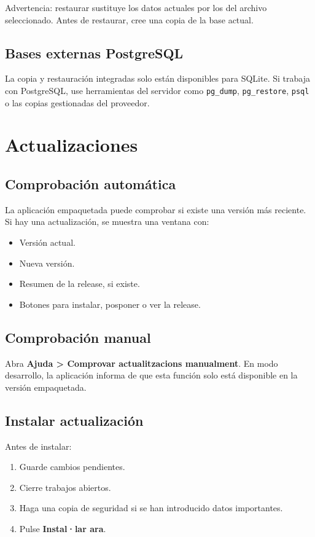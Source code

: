 \documentclass[12pt]{article}
\newcommand{\boton}[1]{\textbf{#1}}
\newcommand{\menu}[1]{\textbf{#1}}
\begin{document}
Advertencia: restaurar sustituye los datos actuales por los del archivo seleccionado. Antes de restaurar, cree una copia de la base actual.

\subsection{Bases externas PostgreSQL}
La copia y restauración integradas solo están disponibles para SQLite. Si trabaja con PostgreSQL, use herramientas del servidor como \texttt{pg\_dump}, \texttt{pg\_restore}, \texttt{psql} o las copias gestionadas del proveedor.

\section{Actualizaciones}
\subsection{Comprobación automática}
La aplicación empaquetada puede comprobar si existe una versión más reciente. Si hay una actualización, se muestra una ventana con:
\begin{itemize}
  \item Versión actual.
  \item Nueva versión.
  \item Resumen de la release, si existe.
  \item Botones para instalar, posponer o ver la release.
\end{itemize}

\subsection{Comprobación manual}
Abra \menu{Ajuda > Comprovar actualitzacions manualment}. En modo desarrollo, la aplicación informa de que esta función solo está disponible en la versión empaquetada.

\subsection{Instalar actualización}
Antes de instalar:
\begin{enumerate}
  \item Guarde cambios pendientes.
  \item Cierre trabajos abiertos.
  \item Haga una copia de seguridad si se han introducido datos importantes.
  \item Pulse \boton{Instal·lar ara}.
\end{enumerate}
\end{document}
